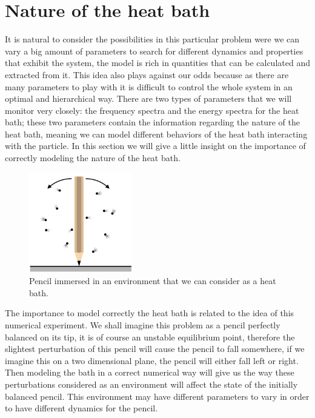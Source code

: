 \section{Nature of the heat bath}
It is natural to consider the possibilities in this particular problem were we can vary a big amount of parameters to search for different dynamics and properties that exhibit the system, the model is rich in quantities that can be calculated and extracted from it. This idea also plays against our odds because as there are many parameters to play with it is difficult to control the whole system in an optimal and hierarchical way. There are two types of parameters that we will monitor very closely: the frequency spectra and the energy spectra for the heat bath; these two parameters contain the information regarding the nature of the heat bath, meaning we can model different behaviors of the heat bath interacting with the particle. In this section we will give a little insight on the importance of correctly modeling the nature of the heat bath.


\begin{figure}[H]
\centering
\includegraphics[width=0.4\textwidth]{Figures/pencilonend-1.png}
\caption{Pencil immersed in an environment that we can consider as a heat bath.
}
\label{fig:pencil}
\end{figure}

The importance to model correctly the heat bath is related to the idea of this numerical experiment. We shall imagine this problem as a pencil perfectly balanced on its tip, it is of course an unstable equilibrium point, therefore the slightest perturbation of this pencil will cause the pencil to fall somewhere, if we imagine this on a two dimensional plane, the pencil will either fall left or right. Then modeling the bath in a correct numerical way will give us the way these perturbations considered as an environment will affect the state of the initially balanced pencil. This environment may have different parameters to vary in order to have different dynamics for the pencil.\par 

